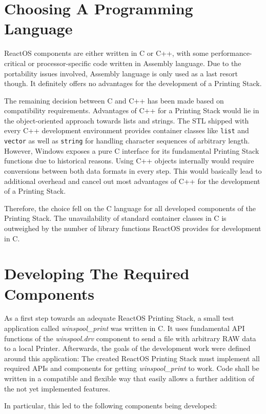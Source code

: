 \section{Choosing A Programming Language}
ReactOS components are either written in C or C++, with some performance-critical or processor-specific code written in Assembly language.
Due to the portability issues involved, Assembly language is only used as a last resort though.
It definitely offers no advantages for the development of a Printing Stack.

The remaining decision between C and C++ has been made based on compatibility requirements.
Advantages of C++ for a Printing Stack would lie in the object-oriented approach towards lists and strings.
The \gls{STL} shipped with every C++ development environment provides container classes like \texttt{list} and \texttt{vector} as well as \texttt{string} for handling character sequences of arbitrary length.
However, Windows exposes a pure C interface for its fundamental Printing Stack functions due to historical reasons.
Using C++ objects internally would require conversions between both data formats in every step.
This would basically lead to additional overhead and cancel out most advantages of C++ for the development of a Printing Stack.

Therefore, the choice fell on the C language for all developed components of the Printing Stack.
The unavailability of standard container classes in C is outweighed by the number of library functions ReactOS provides for development in C.


\section{Developing The Required Components}
As a first step towards an adequate ReactOS Printing Stack, a small test application called \emph{winspool\_print} was written in C.
It uses fundamental \gls{API} functions of the \emph{winspool.drv} component to send a file with arbitrary RAW data to a local Printer.
Afterwards, the goals of the development work were defined around this application:
The created ReactOS Printing Stack must implement all required \glspl{API} and components for getting \emph{winspool\_print} to work.
Code shall be written in a compatible and flexible way that easily allows a further addition of the not yet implemented features.

In particular, this led to the following components being developed:

